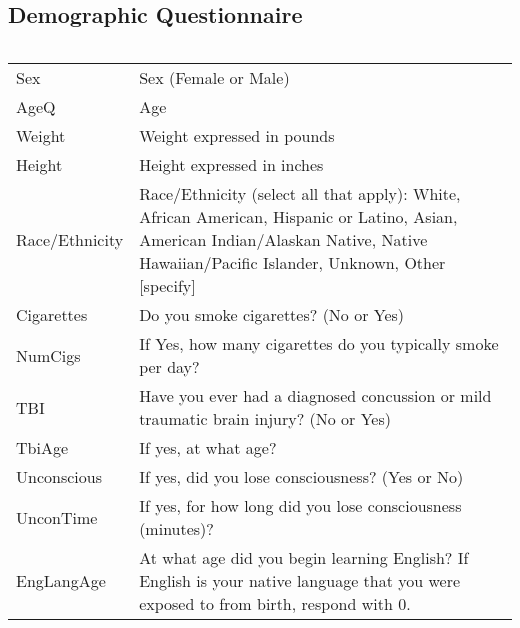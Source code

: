 \documentclass[letterpaper,10pt,english]{sphinxmanual}
\begin{document}
\subsection{Demographic Questionnaire}
\label{\detokenize{Data_Definations_Phase1B:demographic-questionnaire}}

\begin{savenotes}\sphinxattablestart
\centering
\begin{tabulary}{\linewidth}[t]{|T|T|T|T|T|T|T|}
\hline
&&&&&&\\
\hline
\end{tabulary}
\par
\sphinxattableend\end{savenotes}


\begin{savenotes}\sphinxattablestart
\centering
\begin{tabulary}{\linewidth}[t]{|T|T|}
\hline
{}\relax &\relax \\
\hline
Sex
&
Sex (Female or Male)
\\
\hline
AgeQ
&
Age
\\
\hline
Weight
&
Weight expressed in pounds
\\
\hline
Height
&
Height expressed in inches
\\
\hline
Race/Ethnicity
&
Race/Ethnicity (select all that apply): White, African American, Hispanic or Latino, Asian, American Indian/Alaskan Native, Native Hawaiian/Pacific Islander, Unknown, Other {[}specify{]}
\\
\hline
Cigarettes
&
Do you smoke cigarettes? (No or Yes)
\\
\hline
NumCigs
&
If Yes, how many cigarettes do you typically smoke per day?
\\
\hline
TBI
&
Have you ever had a diagnosed concussion or mild traumatic brain injury? (No or Yes)
\\
\hline
TbiAge
&
If yes, at what age?
\\
\hline
Unconscious
&
If yes, did you lose consciousness? (Yes or No)
\\
\hline
UnconTime
&
If yes, for how long did you lose consciousness (minutes)?
\\
\hline
EngLangAge
&
At what age did you begin learning English? If English is your native language that you were exposed to from birth, respond with 0.
\\
\hline

\end{tabulary}
\end{savenotes}
\end{document}
